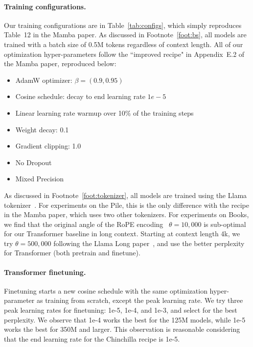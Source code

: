 \documentclass{article}
\begin{document}
\paragraph{Training configurations.}
Our training configurations are in Table~\ref{tab:configs}, which simply reproduces Table~12 in the Mamba paper.
As discussed in Footnote~\ref{foot:bs}, all models are trained with a batch size of 0.5M tokens regardless of context length.
All of our optimization hyper-parameters follow the ``improved recipe" in Appendix~E.2 of the Mamba paper, reproduced below:
\begin{itemize}
\item AdamW optimizer: $\beta = (0.9, 0.95)$
\item Cosine schedule: decay to end learning rate \(1e-5\)
\item Linear learning rate warmup over 10\% of the training steps
\item Weight decay: 0.1
\item Gradient clipping: 1.0
\item No Dropout
\item Mixed Precision
\end{itemize}
As discussed in Footnote~\ref{foot:tokenizer}, all models are trained using the Llama tokenizer~\cite{touvron2023llama}. 
For experiments on the Pile, this is the only difference with the recipe in the Mamba paper, which uses two other tokenizers.
For experiments on Books, we find that the original angle of the RoPE encoding~\cite{su2023roformer} $\theta=10,000$ is sub-optimal for our Transformer baseline in long context.
Starting at context length 4k, we try $\theta=500,000$ following the Llama Long paper~\cite{xiong2023effective}, and use the better perplexity for Transformer (both pretrain and finetune).

\paragraph{Transformer finetuning.}
Finetuning starts a new cosine schedule with the same optimization hyper-parameter as training from scratch, except the peak learning rate.
We try three peak learning rates for finetuning: 1e-5, 1e-4, and 1e-3, and select for the best perplexity.
We observe that 1e-4 works the best for the 125M models, while 1e-5 works the best for 350M and larger.
This observation is reasonable considering that the end learning rate for the Chinchilla recipe is 1e-5.
\end{document}

